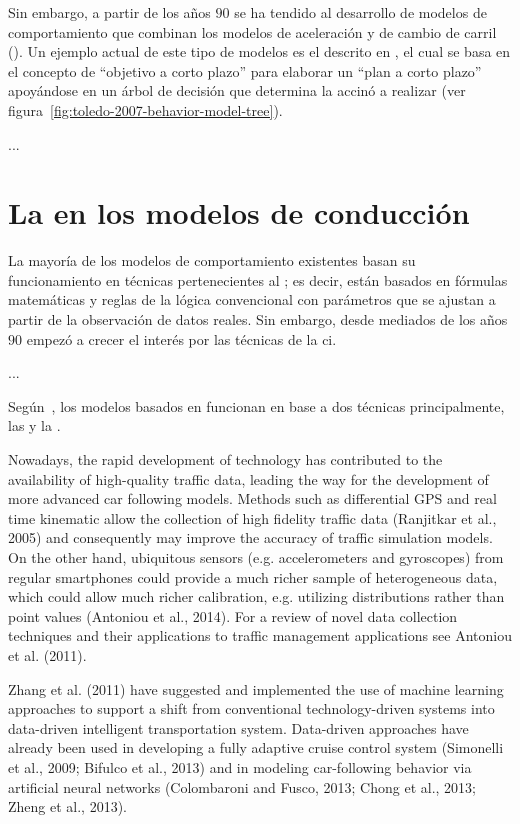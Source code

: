 Sin embargo, a partir de los años $90$ se ha tendido al desarrollo de modelos de comportamiento que combinan los modelos de aceleración y de cambio de carril (\cite{Ma2004}). Un ejemplo actual de este tipo de modelos es el descrito en \cite{Toledo2007}, el cual se basa en el concepto de \enquote{objetivo a corto plazo} para elaborar un \enquote{plan a corto plazo} apoyándose en un árbol de decisión que determina la accinó a realizar (ver figura~\ref{fig:toledo-2007-behavior-model-tree}).

...

\section{La  en los modelos de conducción}

La mayoría de los modelos de comportamiento existentes basan su funcionamiento en técnicas pertenecientes al ; es decir, están basados en fórmulas matemáticas y reglas de la lógica convencional con parámetros que se ajustan a partir de la observación de datos reales. Sin embargo, desde mediados de los años $90$ empezó a crecer el interés por las técnicas de la \gls{ci}.

...



Según~\cite{Aghabayk2015}, los modelos basados en  funcionan en base a dos técnicas principalmente, las  y la .

Nowadays, the rapid development of technology has contributed to the availability of high-quality traffic data, leading the way for the development of more advanced car following models. Methods such as differential GPS and real time kinematic allow the collection of high fidelity traffic data (Ranjitkar et al., 2005) and consequently may improve the accuracy of traffic simulation models. On the other hand, ubiquitous sensors (e.g. accelerometers and gyroscopes) from regular smartphones could provide a much richer sample of heterogeneous data, which could allow much richer calibration, e.g. utilizing distributions rather than point values (Antoniou et al., 2014). For a review of novel data collection techniques and their applications to traffic management applications see Antoniou et al. (2011).

Zhang et al. (2011) have suggested and implemented the use of machine learning approaches to support a shift from conventional technology-driven systems into data-driven intelligent transportation system. Data-driven approaches have already been used in developing a fully adaptive cruise control system (Simonelli et al., 2009; Bifulco et al., 2013) and in modeling car-following behavior via artificial neural networks (Colombaroni and Fusco, 2013; Chong et al., 2013; Zheng et al., 2013).


